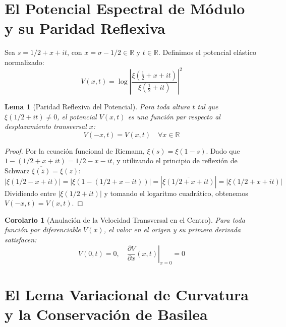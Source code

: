 \documentclass[11pt,a4paper]{article}
\newtheorem{lema}[teorema]{Lema}
\newtheorem{corolario}[teorema]{Corolario}
\begin{document}
\section{El Potencial Espectral de Módulo y su Paridad Reflexiva}

Sea $s = 1/2 + x + it$, con $x = \sigma - 1/2 \in \mathbb{R}$ y $t \in \mathbb{R}$. Definimos el potencial elástico normalizado:
\begin{equation}
    V(x, t) = \log \left| \frac{\xi\left(\frac{1}{2} + x + it\right)}{\xi\left(\frac{1}{2} + it\right)} \right|^2
\end{equation}

\begin{lema}[Paridad Reflexiva del Potencial]
Para toda altura $t$ tal que $\xi(1/2 + it) \ne 0$, el potencial $V(x, t)$ es una función par respecto al desplazamiento transversal $x$:
\begin{equation}
    V(-x, t) = V(x, t) \quad \forall x \in \mathbb{R}
\end{equation}
\end{lema}
\begin{proof}
Por la ecuación funcional de Riemann, $\xi(s) = \xi(1-s)$. Dado que $1 - (1/2 + x + it) = 1/2 - x - it$, y utilizando el principio de reflexión de Schwarz $\overline{\xi(\bar{z})} = \xi(z)$:
\begin{equation}
    |\xi(1/2 - x + it)| = |\xi(1 - (1/2 + x - it))| = |\overline{\xi(1/2 + x + it)}| = |\xi(1/2 + x + it)|
\end{equation}
Dividiendo entre $|\xi(1/2 + it)|$ y tomando el logaritmo cuadrático, obtenemos $V(-x, t) = V(x, t)$.
\end{proof}

\begin{corolario}[Anulación de la Velocidad Transversal en el Centro]
Para toda función par diferenciable $V(x)$, el valor en el origen y su primera derivada satisfacen:
\begin{equation}
    V(0, t) = 0, \quad \left. \frac{\partial V}{\partial x}(x, t) \right|_{x=0} = 0
\end{equation}
\end{corolario}

\section{El Lema Variacional de Curvatura y la Conservación de Basilea}
\end{document}
